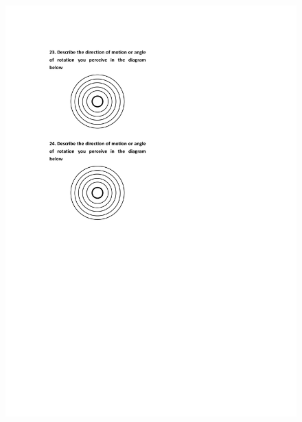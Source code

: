 \begin{figure}[h]
\centering
\includegraphics[width=1\textwidth,height=0.7\textheight]{A_thesis/appendix/Experiment1_questionnaire-6.png}
\end{figure}
\newpage

